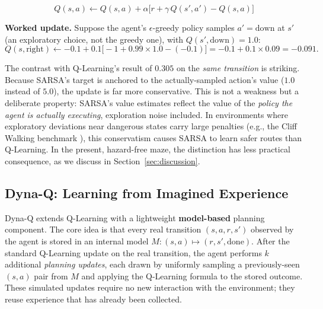 \documentclass[11pt]{article}
\begin{document}
\[
    Q(s, a) \leftarrow Q(s, a) + \alpha \Big[
        r + \gamma\, Q(s', a') - Q(s, a)
    \Big]
\]

\textbf{Worked update.} Suppose the agent's $\epsilon$-greedy policy
samples $a' = \text{down}$ at $s'$ (an exploratory choice, not the
greedy one), with $Q(s', \text{down}) = 1.0$:
\[
    Q(s, \text{right}) \leftarrow
    -0.1 + 0.1\bigl[-1 + 0.99 \times 1.0 - (-0.1)\bigr]
    = -0.1 + 0.1 \times 0.09 = -0.091.
\]

The contrast with Q-Learning's result of $0.305$ on the \emph{same
transition} is striking. Because SARSA's target is anchored to the
actually-sampled action's value ($1.0$ instead of $5.0$), the update is
far more conservative. This is not a weakness but a deliberate property:
SARSA's value estimates reflect the value of the \emph{policy the agent is
actually executing}, exploration noise included. In environments where
exploratory deviations near dangerous states carry large penalties (e.g.,
the Cliff Walking benchmark \cite{sutton2018}), this conservatism causes
SARSA to learn safer routes than Q-Learning. In the present, hazard-free
maze, the distinction has less practical consequence, as we discuss in
Section~\ref{sec:discussion}.

\subsection{Dyna-Q: Learning from Imagined Experience}
\label{sec:dynaq}

Dyna-Q \cite{sutton1991dyna} extends Q-Learning with a lightweight
\textbf{model-based} planning component. The core idea is that every real
transition $(s, a, r, s')$ observed by the agent is stored in an internal
model $M : (s, a) \mapsto (r, s', \text{done})$. After the standard
Q-Learning update on the real transition, the agent performs $k$
additional \emph{planning updates}, each drawn by uniformly sampling a
previously-seen $(s, a)$ pair from $M$ and applying the Q-Learning
formula to the stored outcome. These simulated updates require no new
interaction with the environment; they reuse experience that has already
been collected.
\end{document}

